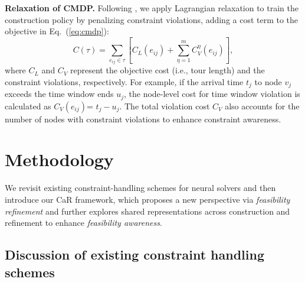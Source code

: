 \documentclass{article} %
\begin{document}
\textbf{{Relaxation of CMDP.}} Following \cite{bi2024learning}, we apply Lagrangian relaxation to train the construction policy by penalizing constraint violations, adding a cost term to the objective in Eq.~(\ref{eq:cmdp}):
\begin{equation}
    C(\tau) = \sum_{e_{ij} \in \tau} \left[C_L \left( e_{ij}\right) \!+\! \sum_{\eta=1}^{m} C_V^{\eta} \left( e_{ij}\right)\right],
    \label{eq:constraint_obj}
\end{equation}
where $C_L$ and $C_V$ represent the objective cost (i.e., tour length) and the constraint violations, respectively.
For example, if the arrival time $t_j$ to node $v_j$ exceeds the time window ends $u_j$, the node-level cost for time window violation is calculated as {$C_V(e_{ij})$= $t_j- u_j$}. The total violation cost $C_V$ also accounts for the number of nodes with constraint violations to enhance constraint awareness.


\section{Methodology}


We revisit existing constraint-handling schemes for neural solvers and then introduce our CaR framework, which proposes a new perspective via \emph{feasibility refinement} and further explores shared representations across construction and refinement to enhance \emph{feasibility awareness}.

\subsection{Discussion of existing constraint handling schemes}
\label{sec:4.1}
\end{document}
